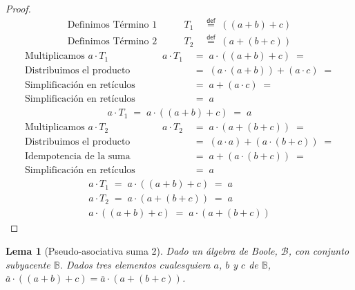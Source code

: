 \documentclass[final,12pt,a4paper,twoside,fleqn]{extbook}
\newcommand{\mathdef}{\ensuremath{\stackrel{\mathsf{def}}{{}={}}}}
\newcommand{\setB}{\ensuremath{\mathbb{B}}}
\newtheorem{lem}[thm]{Lema}
\theoremstyle{definition}
\theoremstyle{remark}
\begin{document}
\begin{proof}
\begin{align}
\text{Definimos Término 1}\qquad& T_1 \;&\mathdef\; \left( \left( a + b \right) + c \right) \\
\text{Definimos Término 2}\qquad& T_2 \;&\mathdef\; \left( a + \left( b + c \right) \right)
\end{align}
\begin{align}
\text{Multiplicamos \(a \cdot T_1\)}\qquad& a \cdot T_1 \;&=\; a \cdot \left( \left( a + b \right) + c \right) \;=\\
\text{Distribuimos el producto}\qquad&{}&=\; \left( a \cdot \left( a + b \right) \right) + \left( a \cdot c \right) \;=\\
\text{Simplificación en retículos}\qquad&{}&=\; a + \left( a \cdot c \right) \;=\\
\text{Simplificación en retículos}\qquad&{}&=\; a \;
\end{align}
\begin{align}
a \cdot T_1 \;=\; a \cdot \left( \left( a + b \right) + c \right) \;=\; a
\end{align}
\begin{align}
\text{Multiplicamos \(a \cdot T_2\)}\qquad& a \cdot T_2 \;&=\; a \cdot \left( a + \left( b  + c \right) \right) \;=\\
\text{Distribuimos el producto}\qquad&{}&=\; \left( a \cdot a \right) + \left( a \cdot \left( b + c \right) \right) \;=\\
\text{Idempotencia de la suma}\qquad&{}&=\; a + \left( a \cdot \left( b + c \right) \right) \;=\\
\text{Simplificación en retículos}\qquad&{}&=\; a \;
\end{align}
\begin{align}
a \cdot T_1 \;=\; a \cdot \left( \left( a + b \right) + c \right) \;=\; a\\
a \cdot T_2 \;=\; a \cdot \left( a + \left( b + c \right) \right) \;=\; a\\
a \cdot \left( \left( a + b \right) + c \right) \;=\; a \cdot \left( a + \left( b + c \right) \right) 
\end{align}
\end{proof}



\begin{lem}[Pseudo-asociativa suma 2]
Dado un álgebra de Boole, \(\mathscr{B}\), con conjunto subyacente \(\setB\). Dados tres elementos cualesquiera \(a\), \(b\) y \(c\) de \(\setB\), \( \overline{a} \cdot ( ( a + b ) + c ) = \overline{a} \cdot ( a + ( b + c ) )\).
\end{lem}
\end{document}
